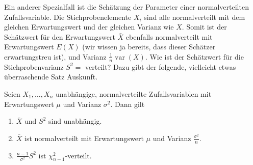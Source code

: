 Ein anderer Spezialfall ist die Schätzung der Parameter einer normalverteilten
Zufallsvariable.
Die Stichprobenelemente $X_i$ sind alle normalverteilt
mit dem gleichen Erwartungswert und der gleichen Varianz wie $X$. 
Somit ist der Schätzwert für den Erwartungswert
$\bar X$
ebenfalls normalverteilt mit Erwartungswert $E(X)$ (wir wissen ja bereits,
dass dieser Schätzer erwartungstreu ist), und Varianz
$\frac1n\operatorname{var}(X)$.
Wie ist der
Schätzwert für die Stichprobenvarianz
$S^2=$
verteilt? Dazu gibt der folgende, vielleicht etwas überraschende Satz Auskunft.
\begin{satz}
Seien $X_1,\dots,X_n$ unabhängige, normalverteilte Zufallsvariablen mit
Erwartungswert $\mu$ und Varianz $\sigma^2$.
Dann gilt
\begin{enumerate}
\item $\bar X$ und $S^2$ sind unabhängig.
\item $\bar X$ ist normalverteilt mit Erwartungswert $\mu$ und Varianz
$\frac{\sigma^2}{n}$.
\item $\frac{n-1}{\sigma^2}S^2$ ist $\chi^2_{n-1}$-verteilt.
\end{enumerate}
\end{satz}
